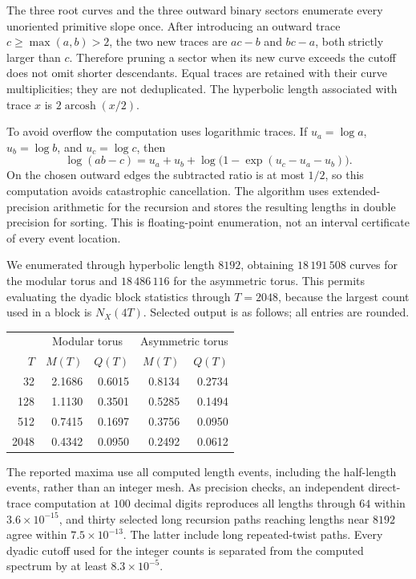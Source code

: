 \documentclass[11pt,a4paper]{article}
\numberwithin{equation}{section}
\theoremstyle{definition}
\theoremstyle{remark}
\DeclareMathOperator{\arcosh}{arcosh}
\begin{document}
The three root curves and the three outward binary sectors enumerate
every unoriented primitive slope once. After introducing an outward
trace $c\ge\max(a,b)>2$, the two new traces are $ac-b$ and $bc-a$,
both strictly larger than $c$. Therefore pruning a sector when its new
curve exceeds the cutoff does not omit shorter descendants. Equal traces
are retained with their curve multiplicities; they are not deduplicated.
The hyperbolic length associated with trace $x$ is $2\arcosh(x/2)$.

To avoid overflow the computation uses logarithmic traces. If
$u_a=\log a$, $u_b=\log b$, and $u_c=\log c$, then
\[
 \log(ab-c)=u_a+u_b+
        \log\bigl(1-\exp(u_c-u_a-u_b)\bigr).
\]
On the chosen outward edges the subtracted ratio is at most $1/2$,
so this computation avoids catastrophic cancellation. The algorithm
uses extended-precision arithmetic for the recursion and stores the
resulting lengths in double precision for sorting. This is floating-point
enumeration, not an interval certificate of every event location.

We enumerated through hyperbolic length $8192$, obtaining
$18\,191\,508$ curves for the modular torus and $18\,486\,116$ for
the asymmetric torus. This permits evaluating the dyadic block statistics
through $T=2048$, because the largest count used in a block is $N_X(4T)$.
Selected output is as follows; all entries are rounded.

\begin{center}
\begin{tabular}{r r r r r}
\toprule
&\multicolumn{2}{c}{Modular torus}&\multicolumn{2}{c}{Asymmetric torus}\\
$T$&$M(T)$&$Q(T)$&$M(T)$&$Q(T)$\\
\midrule
32 & 2.1686 & 0.6015 & 0.8134 & 0.2734 \\
128 & 1.1130 & 0.3501 & 0.5285 & 0.1494 \\
512 & 0.7415 & 0.1697 & 0.3756 & 0.0950 \\
2048 & 0.4342 & 0.0950 & 0.2492 & 0.0612 \\
\bottomrule
\end{tabular}
\end{center}

The reported maxima use all computed length events, including the
half-length events, rather than an integer mesh. As precision checks,
an independent direct-trace computation at $100$ decimal digits reproduces
all lengths through $64$ within $3.6\times10^{-15}$, and thirty
selected long recursion paths reaching lengths near $8192$ agree within
$7.5\times10^{-13}$. The latter include long repeated-twist paths.
Every dyadic cutoff used for the integer counts is separated from the
computed spectrum by at least $8.3\times10^{-5}$.
\end{document}
